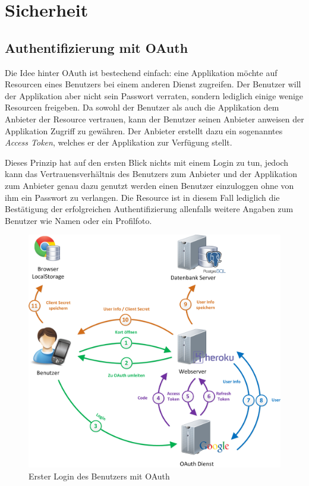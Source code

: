 \section{Sicherheit}
\subsection{Authentifizierung mit OAuth}
\label{oauth}

Die Idee hinter \gls{OAuth} ist bestechend einfach: eine Applikation möchte auf Resourcen eines Benutzers bei einem anderen Dienst zugreifen.
Der Benutzer will der Applikation aber nicht sein Passwort verraten, sondern lediglich einige wenige Resourcen freigeben.
Da sowohl der Benutzer als auch die Applikation dem Anbieter der Resource vertrauen, kann der Benutzer seinen Anbieter anweisen der Applikation Zugriff zu gewähren.
Der Anbieter erstellt dazu ein sogenanntes \emph{Access Token}, welches er der Applikation zur Verfügung stellt.

Dieses Prinzip hat auf den ersten Blick nichts mit einem Login zu tun, jedoch kann das Vertrauensverhältnis des Benutzers zum Anbieter und der Applikation zum Anbieter genau dazu genutzt werden einen Benutzer einzuloggen ohne von ihm ein Passwort zu verlangen. 
Die Resource ist in diesem Fall lediglich die Bestätigung der erfolgreichen Authentifizierung allenfalls weitere Angaben zum Benutzer wie Namen oder ein Profilfoto.

\begin{figure}[H]
	\centering
	\includegraphics[scale=0.4]{images/implementation/backend/kort-login}
	\caption{Erster Login des Benutzers mit OAuth}
	\label{image-kort-login}
\end{figure}

